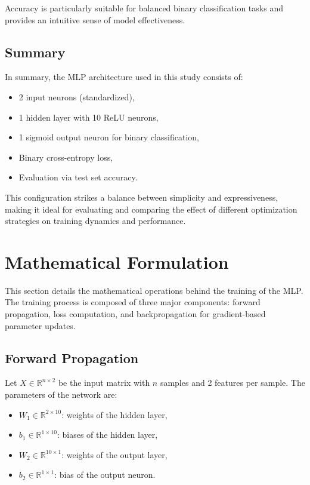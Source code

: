 \documentclass[12pt]{article}
\begin{document}
Accuracy is particularly suitable for balanced binary classification tasks and provides an intuitive sense of model effectiveness.

\subsection{Summary}

In summary, the MLP architecture used in this study consists of:
\begin{itemize}
    \item 2 input neurons (standardized),
    \item 1 hidden layer with 10 ReLU neurons,
    \item 1 sigmoid output neuron for binary classification,
    \item Binary cross-entropy loss,
    \item Evaluation via test set accuracy.
\end{itemize}

This configuration strikes a balance between simplicity and expressiveness, making it ideal for evaluating and comparing the effect of different optimization strategies on training dynamics and performance.
\section{Mathematical Formulation}

This section details the mathematical operations behind the training of the MLP. The training process is composed of three major components: forward propagation, loss computation, and backpropagation for gradient-based parameter updates.

\subsection{Forward Propagation}

Let $X \in \mathbb{R}^{n \times 2}$ be the input matrix with $n$ samples and 2 features per sample. The parameters of the network are:

\begin{itemize}
    \item $W_1 \in \mathbb{R}^{2 \times 10}$: weights of the hidden layer,
    \item $b_1 \in \mathbb{R}^{1 \times 10}$: biases of the hidden layer,
    \item $W_2 \in \mathbb{R}^{10 \times 1}$: weights of the output layer,
    \item $b_2 \in \mathbb{R}^{1 \times 1}$: bias of the output neuron.
\end{itemize}
\end{document}
